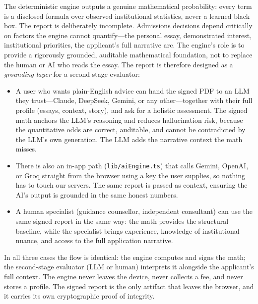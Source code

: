 \documentclass[conference]{IEEEtran}
\begin{document}
The deterministic engine outputs a genuine mathematical probability: every term is a disclosed formula over observed institutional statistics, never a learned black box. The report is deliberately incomplete. Admissions decisions depend critically on factors the engine cannot quantify---the personal essay, demonstrated interest, institutional priorities, the applicant's full narrative arc. The engine's role is to provide a rigorously grounded, auditable mathematical foundation, not to replace the human or AI who reads the essay. The report is therefore designed as a \textit{grounding layer} for a second-stage evaluator:

\begin{itemize}
    \item A user who wants plain-English advice can hand the signed PDF to an LLM they trust---Claude, DeepSeek, Gemini, or any other---together with their full profile (essays, context, story), and ask for a holistic assessment. The signed math anchors the LLM's reasoning and reduces hallucination risk, because the quantitative odds are correct, auditable, and cannot be contradicted by the LLM's own generation. The LLM adds the narrative context the math misses.
    \item There is also an in-app path (\texttt{lib/aiEngine.ts}) that calls Gemini, OpenAI, or Groq straight from the browser using a key the user supplies, so nothing has to touch our servers. The same report is passed as context, ensuring the AI's output is grounded in the same honest numbers.
    \item A human specialist (guidance counsellor, independent consultant) can use the same signed report in the same way: the math provides the structural baseline, while the specialist brings experience, knowledge of institutional nuance, and access to the full application narrative.
\end{itemize}

In all three cases the flow is identical: the engine computes and signs the math; the second-stage evaluator (LLM or human) interprets it alongside the applicant's full context. The engine never leaves the device, never collects a fee, and never stores a profile. The signed report is the only artifact that leaves the browser, and it carries its own cryptographic proof of integrity.
\end{document}
